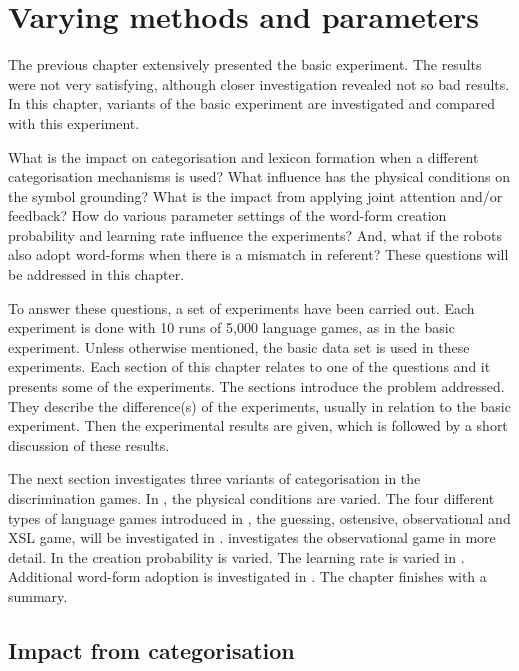\chapter{Varying methods and parameters} \label{ch:lex}\label{ch:cat}\label{ch:interaction}\label{ch:feedback}\label{ch:par}

The previous chapter extensively presented the basic experiment. The results were not very satisfying, although closer investigation revealed not so bad results. In this chapter, variants of the basic experiment are investigated and compared with this experiment.

What is the impact on categorisation and lexicon formation when a different categorisation mechanisms is used? What influence has the physical conditions on the symbol grounding? What is the impact from applying joint attention and/or feedback? How do various parameter settings of the word-form creation probability and learning rate influence the experiments? And, what if the robots also adopt word-forms when there is a mismatch in referent? These questions will be addressed in this chapter.

To answer these questions, a set of experiments have been carried out. Each experiment is done with 10 runs of 5,000 language games, as in the basic experiment. Unless otherwise mentioned, the basic data set is used in these experiments. Each section of this chapter relates to one of the questions and it presents some of the experiments. The sections introduce the problem addressed. They describe the difference(s) of the experiments, usually in relation to the basic experiment. Then the experimental results are given, which is followed by a short discussion of these results.


The next section investigates three variants of categorisation in the discrimination games. In , the physical conditions are varied. The four different types of language games introduced in , the guessing, ostensive, observational and XSL game, will be investigated in .  investigates the observational game in more detail. In  the creation probability is varied. The learning rate is varied in . Additional word-form adoption is investigated in . The chapter finishes with a summary.

\section{Impact from categorisation}\label{s:par:cat}

